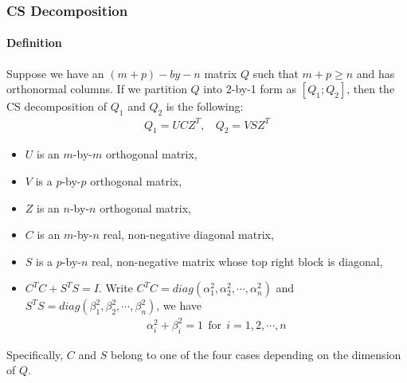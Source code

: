     
\subsubsection{CS Decomposition} \label{csd}


\paragraph{Definition} Suppose we have an $(m+p)-by-n$ matrix $Q$ such that $m+p \geq n$ and has orthonormal columns. If we partition $Q$ into 2-by-1 form as $[Q_1; Q_2]$, then the CS decomposition of $Q_1$ and $Q_2$ is the following:
    \begin{align}
        Q_1 = UCZ^T,\ \  \ \ Q_2 = VSZ^T
    \end{align}
    \begin{itemize}
        \item $U$ is an $m$-by-$m$ orthogonal matrix,
        \item $V$ is a $p$-by-$p$ orthogonal matrix, 
        \item $Z$ is an $n$-by-$n$ orthogonal matrix, 
        \item $C$ is an $m$-by-$n$ real, non-negative diagonal matrix,
        \item $S$ is a $p$-by-$n$ real, non-negative matrix whose top right block is diagonal,
        \item $C^{T}C + S^{T}S = I$. Write $C^{T}C = diag(\alpha_1^{2}, \alpha_2^{2}, \cdots, \alpha_n^{2})$ and $S^{T}S = diag(\beta_1^{2}, \beta_2^{2}, \cdots, \beta_n^{2})$, we have 
        \begin{align} \label{cosine-sine}
            \alpha_i^{2} + \beta_i^{2} = 1 \ \  \text{for} \ \ i = 1,2,\cdots,n
        \end{align}
    \end{itemize}
    Specifically, $C$ and $S$ belong to one of the four cases depending on the dimension of $Q$.
